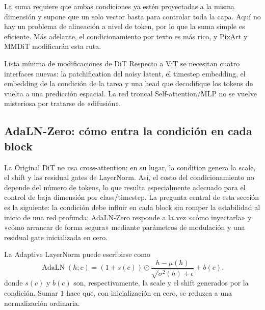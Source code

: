
La suma requiere que ambas condiciones ya estén proyectadas a la misma dimensión y supone que un solo vector basta para controlar toda la capa. Aquí no hay un problema de alineación a nivel de token, por lo que la suma simple es eficiente. Más adelante, el condicionamiento por texto es más rico, y PixArt y MMDiT modificarán esta ruta.

\begin{importantbox}{Lista mínima de modificaciones de DiT}
Respecto a ViT se necesitan cuatro interfaces nuevas: la patchification del noisy latent, el timestep embedding, el embedding de la condición de la tarea y una head que decodifique los tokens de vuelta a una predicción espacial. La red troncal Self-attention/MLP no se vuelve misteriosa por tratarse de «difusión».
\end{importantbox}

\subsection{AdaLN-Zero: cómo entra la condición en cada block}

La Original DiT no usa cross-attention; en su lugar, la condition genera la scale, el shift y las residual gates de LayerNorm. Así, el costo del condicionamiento no depende del número de tokens, lo que resulta especialmente adecuado para el control de baja dimensión por class/timestep. La pregunta central de esta sección es la siguiente: la condición debe influir en cada block sin romper la estabilidad al inicio de una red profunda; AdaLN-Zero responde a la vez «cómo inyectarla» y «cómo arrancar de forma segura» mediante parámetros de modulación y una residual gate inicializada en cero.


La Adaptive LayerNorm puede escribirse como
\[
\operatorname{AdaLN}(h;c)=
(1+s(c))\odot\frac{h-\mu(h)}{\sqrt{\sigma^2(h)+\epsilon}}+b(c),
\]
donde $s(c)$ y $b(c)$ son, respectivamente, la scale y el shift generados por la condición. Sumar $1$ hace que, con inicialización en cero, se reduzca a una normalización ordinaria.


